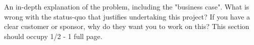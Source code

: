 An in-depth explanation of the problem, including the "business case". What is wrong with the status-quo that justifies undertaking this project? If you have a clear customer or sponsor, why do they want you to work on this? This section should occupy 1/2 - 1 full page.